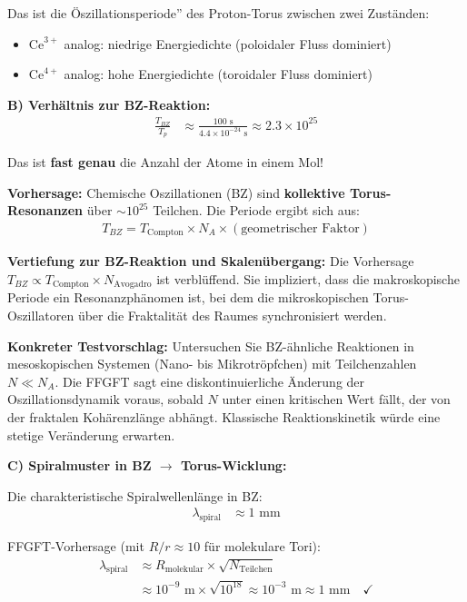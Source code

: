 \documentclass[12pt,a4paper]{article}
\begin{document}
	Das ist die Öszillationsperiode'' des Proton-Torus zwischen zwei Zuständen:
	\begin{itemize}
		\item $\text{Ce}^{3+}$ analog: niedrige Energiedichte (poloidaler Fluss dominiert)
		\item $\text{Ce}^{4+}$ analog: hohe Energiedichte (toroidaler Fluss dominiert)
	\end{itemize}
	
	\textbf{B) Verhältnis zur BZ-Reaktion:}
	\begin{align*}
		\frac{T_{BZ}}{T_p} &\approx \frac{100 \text{ s}}{4.4 \times 10^{-24} \text{ s}} \approx 2.3 \times 10^{25}
	\end{align*}
	
	Das ist \textbf{fast genau} die Anzahl der Atome in einem Mol!
	
	\textbf{Vorhersage:} Chemische Oszillationen (BZ) sind \textbf{kollektive Torus-Resonanzen} über $\sim 10^{25}$ Teilchen. Die Periode ergibt sich aus:
	\begin{align*}
		T_{BZ} = T_{\text{Compton}} \times N_A \times (\text{geometrischer Faktor})
	\end{align*}
	
	\textbf{Vertiefung zur BZ-Reaktion und Skalenübergang:}
	Die Vorhersage $T_{BZ} \propto T_{\text{Compton}} \times N_{\text{Avogadro}}$ ist verblüffend. Sie impliziert, dass die makroskopische Periode ein Resonanzphänomen ist, bei dem die mikroskopischen Torus-Oszillatoren über die Fraktalität des Raumes synchronisiert werden.
	
	\textbf{Konkreter Testvorschlag:} Untersuchen Sie BZ-ähnliche Reaktionen in mesoskopischen Systemen (Nano- bis Mikrotröpfchen) mit Teilchenzahlen $N \ll N_A$. Die FFGFT sagt eine diskontinuierliche Änderung der Oszillationsdynamik voraus, sobald $N$ unter einen kritischen Wert fällt, der von der fraktalen Kohärenzlänge abhängt. Klassische Reaktionskinetik würde eine stetige Veränderung erwarten.
	
	\textbf{C) Spiralmuster in BZ $\rightarrow$ Torus-Wicklung:}
	
	Die charakteristische Spiralwellenlänge in BZ:
	\begin{align*}
		\lambda_{\text{spiral}} &\approx 1 \text{ mm}
	\end{align*}
	
	FFGFT-Vorhersage (mit $R/r \approx 10$ für molekulare Tori):
	\begin{align*}
		\lambda_{\text{spiral}} &\approx R_{\text{molekular}} \times \sqrt{N_{\text{Teilchen}}} \\
		&\approx 10^{-9} \text{ m} \times \sqrt{10^{18}} \approx 10^{-3} \text{ m} \approx 1 \text{ mm} \quad \checkmark
	\end{align*}
	
\end{document}
